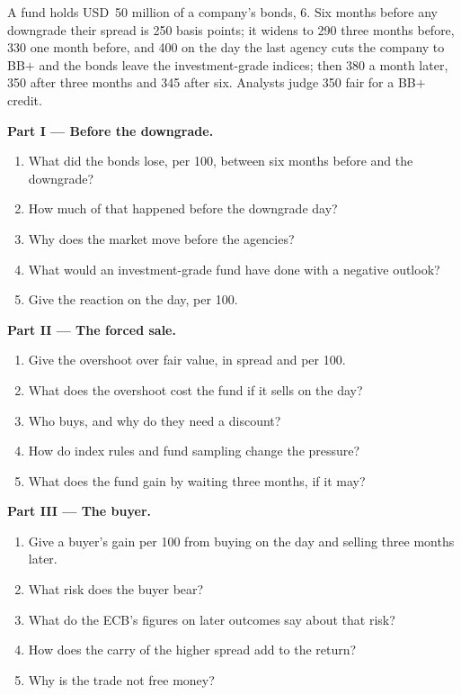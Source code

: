 \begin{problem}\label{pb:m2:corporate-bonds:1}
A fund holds USD~50 million of a company's bonds,  6. Six months
before any downgrade their spread is 250 basis points; it widens to 290 three months
before, 330 one month before, and 400 on the day the last agency cuts the company to
BB$+$ and the bonds leave the investment-grade indices; then 380 a month later, 350
after three months and 345 after six. Analysts judge 350 fair for a BB$+$ credit.

\medskip\noindent\textbf{Part I --- Before the downgrade.}
\begin{enumerate}
\item What did the bonds lose, per 100, between six months before and the downgrade?
\item How much of that happened before the downgrade day?
\item Why does the market move before the agencies?
\item What would an investment-grade fund have done with a negative outlook?
\item Give the reaction on the day, per 100.
\end{enumerate}

\medskip\noindent\textbf{Part II --- The forced sale.}
\begin{enumerate}[resume]
\item Give the overshoot over fair value, in spread and per 100.
\item What does the overshoot cost the fund if it sells on the day?
\item Who buys, and why do they need a discount?
\item How do index rules and fund sampling change the pressure?
\item What does the fund gain by waiting three months, if it may?
\end{enumerate}

\medskip\noindent\textbf{Part III --- The buyer.}
\begin{enumerate}[resume]
\item Give a buyer's gain per 100 from buying on the day and selling three months later.
\item What risk does the buyer bear?
\item What do the ECB's figures on later outcomes say about that risk?
\item How does the carry of the higher spread add to the return?
\item Why is the trade not free money?
\end{enumerate}


\end{problem}
